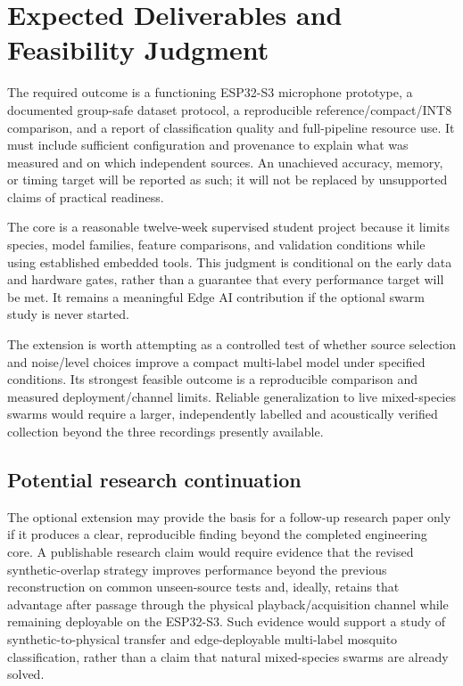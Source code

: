 \documentclass[a4paper,11pt]{article}
\begin{document}
\section{Expected Deliverables and Feasibility Judgment}
The required outcome is a functioning ESP32-S3 microphone prototype, a documented group-safe dataset protocol, a reproducible reference/compact/INT8 comparison, and a report of classification quality and full-pipeline resource use. It must include sufficient configuration and provenance to explain what was measured and on which independent sources. An unachieved accuracy, memory, or timing target will be reported as such; it will not be replaced by unsupported claims of practical readiness.

The core is a reasonable twelve-week supervised student project because it limits species, model families, feature comparisons, and validation conditions while using established embedded tools. This judgment is conditional on the early data and hardware gates, rather than a guarantee that every performance target will be met. It remains a meaningful Edge AI contribution if the optional swarm study is never started.

The extension is worth attempting as a controlled test of whether source selection and noise/level choices improve a compact multi-label model under specified conditions. Its strongest feasible outcome is a reproducible comparison and measured deployment/channel limits. Reliable generalization to live mixed-species swarms would require a larger, independently labelled and acoustically verified collection beyond the three recordings presently available.

\subsection{Potential research continuation}
The optional extension may provide the basis for a follow-up research paper only if it produces a clear, reproducible finding beyond the completed engineering core. A publishable research claim would require evidence that the revised synthetic-overlap strategy improves performance beyond the previous reconstruction on common unseen-source tests and, ideally, retains that advantage after passage through the physical playback/acquisition channel while remaining deployable on the ESP32-S3. Such evidence would support a study of synthetic-to-physical transfer and edge-deployable multi-label mosquito classification, rather than a claim that natural mixed-species swarms are already solved.
\end{document}

